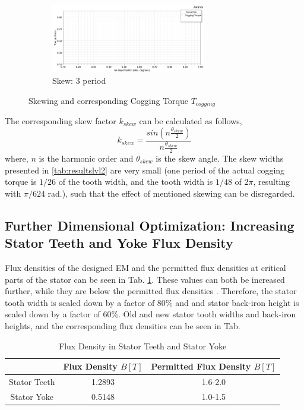 \documentclass [a4 paper, 11pt, titlepage] {article}
\begin{document}
\begin{figure}
	     \hfill
	     \begin{subfigure}[b]{1.0\textwidth}
	         \centering
	         \includegraphics[height=3cm]{Tcogg_2426_a-3.png}
	         \caption{Skew: 3 period}
	         \label{fig:five over x}
	     \end{subfigure}
	        \caption{Skewing and corresponding Cogging Torque $T_{cogging}$}
	        \label{fig:coggingTorque}
	\end{figure}
	
	The corresponding skew factor $k_{skew}$ can be calculated as follows,
	\begin{equation}
		k_{skew}=\frac{sin(n\frac{\theta_{skew}}{2})}{n\frac{\theta_{skew}}{2}}
	\end{equation}
	where, $n$ is the harmonic order and $\theta_{skew}$ is the skew angle. The skew widths presented in \ref{tab:resultslvl2} are very small (one period of the actual cogging torque is $1/26$ of the tooth width, and the tooth width is $1/48$ of $2\pi$, resulting with $\pi/624$ rad.), such that the effect of mentioned skewing can be disregarded.
	
	
	\subsection{Further Dimensional Optimization: Increasing Stator Teeth and Yoke Flux Density} 
	
	Flux densities of the designed EM and the permitted flux densities at critical parts of the stator can be seen in Tab. \ref{tab:fluxDensityinCrit.1}. These values can both be increased further, while they are below the permitted flux densities \cite{pyrhonen_design_2014}. Therefore, the stator tooth width is scaled down by a factor of 80\% and and stator back-iron height is scaled down by a factor of 60\%. Old and new stator tooth widths and back-iron heights, and the corresponding flux densities can be seen in Tab.
	
	\begin{table}[h]
		\begin{center}
			\begin{tabular}{c|c|c}
				& Flux Density $B [T]$ & Permitted Flux Density $B [T]$ \\
				\hline
				Stator Teeth & 1.2893 & 1.6-2.0\\
				\hline\hline
				Stator Yoke & 0.5148 & 1.0-1.5\\
			\end{tabular}
		\end{center}
		\caption{Flux Density in Stator Teeth and Stator Yoke \cite{pyrhonen_design_2014}}
		\label{tab:fluxDensityinCrit.1}
	\end{table}
	
\end{document}

